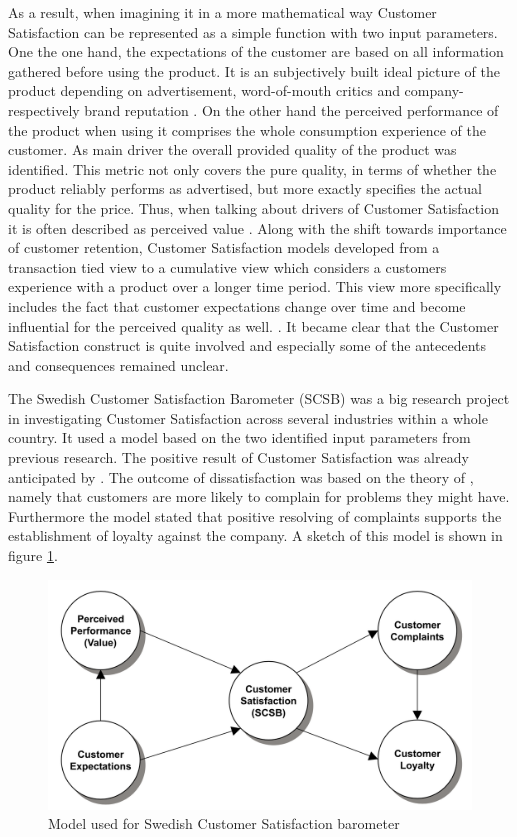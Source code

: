 As a result, when imagining it in a more mathematical way Customer Satisfaction can be represented as a simple function with two input parameters. One the one hand, the expectations of the customer are based on all information gathered before using the product. It is an subjectively built ideal picture of the product depending on advertisement, word-of-mouth critics and company- respectively brand reputation \cite{johnson2001evolution} \cite{neckel2015}. On the other hand the perceived performance of the product when using it comprises the whole consumption experience of the customer. As main driver the overall provided quality of the product was identified. This metric not only covers the pure quality, in terms of whether the product reliably performs as advertised, but more exactly specifies the actual quality for the price. Thus, when talking about drivers of Customer Satisfaction it is often described as perceived value \cite{johnson2001evolution} \cite{fornell1992national}. Along with the shift towards importance of customer retention, Customer Satisfaction models developed from a transaction tied view to a cumulative view which considers a customers experience with a product over a longer time period. This view more specifically includes the fact that customer expectations change over time and become influential for the perceived quality as well. \cite{johnson1996expectations}. It became clear that the Customer Satisfaction construct is quite involved and especially some of the antecedents and consequences remained unclear. 

The Swedish Customer Satisfaction Barometer (SCSB) was a big research project in investigating Customer Satisfaction across several industries within a whole country. It used a model based on the two identified input parameters from previous research. The positive result of Customer Satisfaction was already anticipated by \cite{bolton1998dynamic} \cite{gustafsson2005effects}. The outcome of dissatisfaction was based on the theory of \cite{hulett1971exit}, namely that customers are more likely to complain for problems they might have. Furthermore the model stated that positive resolving of complaints supports the establishment of loyalty against the company. A sketch of this model is shown in figure \ref{fig:scsb}.

\begin{figure}
	\centering
	\includegraphics[width=1.0\textwidth]{img/scsb.png}
	\caption{Model used for Swedish Customer Satisfaction barometer \cite{fornell1992national}}
	\label{fig:scsb}
\end{figure} 


